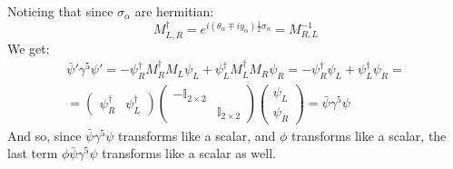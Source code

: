\documentclass{article}
\begin{document}
Noticing that since $\sigma_\alpha$ are hermitian:
\begin{equation}
    M_{L, R}^\dagger = e^{i(\theta_\alpha \mp iy_\alpha)\frac{1}{2}\sigma_\alpha} = M_{R,L}^{-1}
\end{equation}
We get:
\begin{equation}
\begin{gathered}
    \bar{\psi}'\gamma^5\psi' = - \psi_R^\dagger M_R^\dagger M_L\psi_L + \psi_L^\dagger M_L^\dagger M_R\psi_R = - \psi_R^\dagger \psi_L + \psi_L^\dagger \psi_R = \\ =
    \begin{pmatrix}
        \psi_R^\dagger & \psi_L^\dagger
    \end{pmatrix}
    \begin{pmatrix}
        -\mathbb{I}_{2\times2} & \\ & \mathbb{I}_{2\times2}
    \end{pmatrix}
    \begin{pmatrix}
        \psi_L \\ \psi_R
    \end{pmatrix}
    = \bar{\psi}\gamma^5\psi
\end{gathered}
\end{equation}
And so, since $\bar{\psi}\gamma^5\psi$ transforms like a scalar, and $\phi$ transforms like a scalar, the last term $\phi\bar{\psi}\gamma^5\psi$ transforms like a scalar as well.
\end{document}
